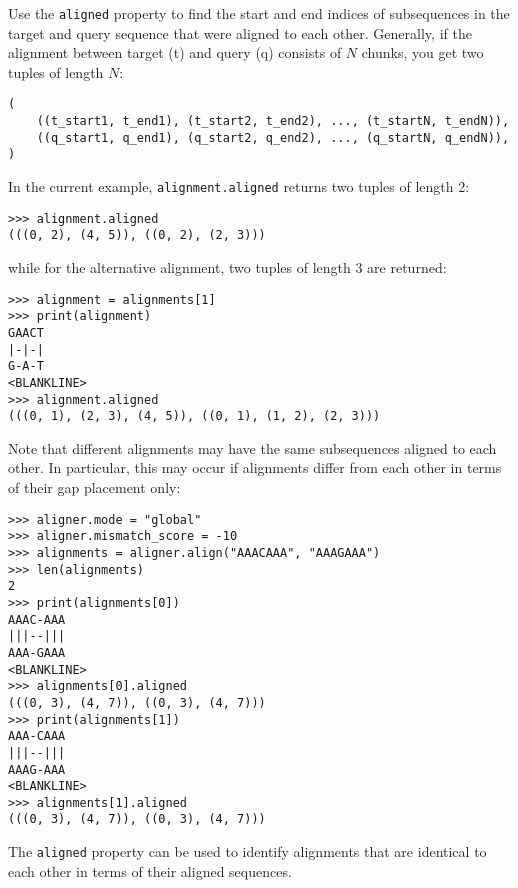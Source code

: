 Use the \verb+aligned+ property to find the start and end indices of subsequences in the target and query sequence that were aligned to each other.
Generally, if the alignment between target (t) and query (q) consists of $N$
chunks, you get two tuples of length $N$:

\begin{verbatim}
(
    ((t_start1, t_end1), (t_start2, t_end2), ..., (t_startN, t_endN)),
    ((q_start1, q_end1), (q_start2, q_end2), ..., (q_startN, q_endN)),
)
\end{verbatim}

In the current example, \verb+alignment.aligned+ returns two tuples of length 2:

\begin{verbatim}
>>> alignment.aligned
(((0, 2), (4, 5)), ((0, 2), (2, 3)))
\end{verbatim}
while for the alternative alignment, two tuples of length 3 are returned:

\begin{verbatim}
>>> alignment = alignments[1]
>>> print(alignment)
GAACT
|-|-|
G-A-T
<BLANKLINE>
>>> alignment.aligned
(((0, 1), (2, 3), (4, 5)), ((0, 1), (1, 2), (2, 3)))
\end{verbatim}
Note that different alignments may have the same subsequences aligned to each other. In particular, this may occur if alignments differ from each other in terms of their gap placement only:

\begin{verbatim}
>>> aligner.mode = "global"
>>> aligner.mismatch_score = -10
>>> alignments = aligner.align("AAACAAA", "AAAGAAA")
>>> len(alignments)
2
>>> print(alignments[0])
AAAC-AAA
|||--|||
AAA-GAAA
<BLANKLINE>
>>> alignments[0].aligned
(((0, 3), (4, 7)), ((0, 3), (4, 7)))
>>> print(alignments[1])
AAA-CAAA
|||--|||
AAAG-AAA
<BLANKLINE>
>>> alignments[1].aligned
(((0, 3), (4, 7)), ((0, 3), (4, 7)))
\end{verbatim}
The \verb+aligned+ property can be used to identify alignments that are identical to each other in terms of their aligned sequences.

